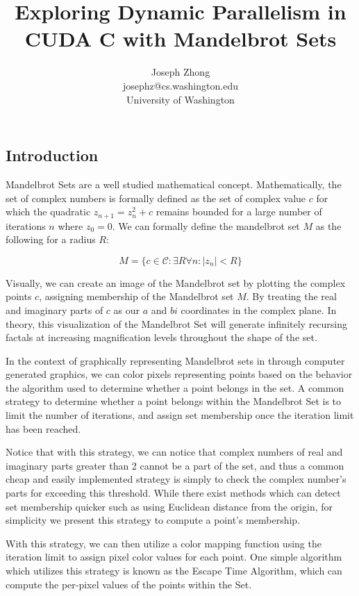 \documentclass[letterpaper]{article}
\title{Exploring Dynamic Parallelism in CUDA C with Mandelbrot Sets}
\author{Joseph Zhong
\\ josephz@cs.washington.edu
\\ University of Washington}
\begin{document}
\maketitle
\begin{multicols}{2}

  \section{Introduction}

Mandelbrot Sets are a well studied mathematical concept. Mathematically, the set
  of complex numbers is formally defined as the set of complex value $c$ for 
  which the quadratic $z_{n+1} = z_n^2+c$ remains bounded for a large number of 
  iterations $n$ where $z_0 = 0$. We can formally define the mandelbrot set $M$
  as the following for a radius $R$:

  $$M = \{ c \in \mathcal{C} : \exists R \forall n : |z_n| < R  \}$$

Visually, we can create an image of the Mandelbrot set by plotting the complex
  points $c$, assigning membership of the Mandelbrot set $M$. By treating the
  real and imaginary parts of $c$ as our $a$ and $bi$ coordinates in the complex
  plane. In theory, this visualization of the Mandelbrot Set will generate
  infinitely recursing factals at increasing magnification levels throughout the
  shape of the set.

In the context of graphically representing Mandelbrot sets in through computer 
  generated graphics, we can color pixels representing points based on the
  behavior the algorithm used to determine whether a point belongs in the set. A
  common strategy to determine whether a point belongs within the Mandelbrot Set
  is to limit the number of iterations, and assign set membership once the 
  iteration limit has been reached.

Notice that with this strategy, we can notice that complex numbers of real and
  imaginary parts greater than 2 cannot be a part of the set, and thus a common
  cheap and easily implemented strategy is simply to check the complex number's
  parts for exceeding this threshold. While there exist methods which can detect
  set membership quicker such as using Euclidean distance from the origin, for
  simplicity we present this strategy to compute a point's membership.

With this strategy, we can then utilize a color mapping function using the
  iteration limit to assign pixel color values for each point. One simple
  algorithm which utilizes this strategy is known as the Escape Time Algorithm,
  which can compute the per-pixel values of the points within the Set.
  

\end{multicols}
\end{document}
